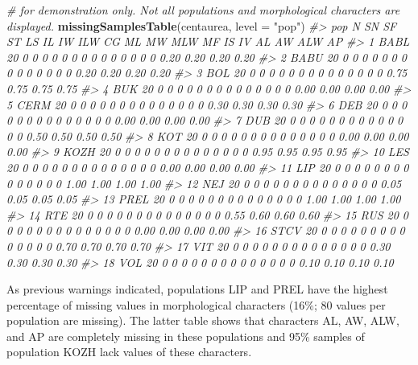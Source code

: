 \documentclass[
]{article}
\newenvironment{Shaded}{\begin{snugshade}}{\end{snugshade}}
\newcommand{\CommentTok}[1]{\textcolor[rgb]{0.56,0.35,0.01}{\textit{#1}}}
\newcommand{\DataTypeTok}[1]{\textcolor[rgb]{0.13,0.29,0.53}{#1}}
\newcommand{\KeywordTok}[1]{\textcolor[rgb]{0.13,0.29,0.53}{\textbf{#1}}}
\newcommand{\NormalTok}[1]{#1}
\newcommand{\StringTok}[1]{\textcolor[rgb]{0.31,0.60,0.02}{#1}}
\begin{document}
\begin{Shaded}
\begin{Highlighting}[]
\CommentTok{# for demonstration only. Not all populations and morphological characters are displayed.}
\KeywordTok{missingSamplesTable}\NormalTok{(centaurea, }\DataTypeTok{level =} \StringTok{"pop"}\NormalTok{)}
\CommentTok{#>     pop  N SN SF ST LS IL IW ILW CG ML MW MLW MF IS IV   AL   AW  ALW   AP}
\CommentTok{#> 1  BABL 20  0  0  0  0  0  0   0  0  0  0   0  0  0  0 0.20 0.20 0.20 0.20}
\CommentTok{#> 2  BABU 20  0  0  0  0  0  0   0  0  0  0   0  0  0  0 0.20 0.20 0.20 0.20}
\CommentTok{#> 3   BOL 20  0  0  0  0  0  0   0  0  0  0   0  0  0  0 0.75 0.75 0.75 0.75}
\CommentTok{#> 4   BUK 20  0  0  0  0  0  0   0  0  0  0   0  0  0  0 0.00 0.00 0.00 0.00}
\CommentTok{#> 5  CERM 20  0  0  0  0  0  0   0  0  0  0   0  0  0  0 0.30 0.30 0.30 0.30}
\CommentTok{#> 6   DEB 20  0  0  0  0  0  0   0  0  0  0   0  0  0  0 0.00 0.00 0.00 0.00}
\CommentTok{#> 7   DUB 20  0  0  0  0  0  0   0  0  0  0   0  0  0  0 0.50 0.50 0.50 0.50}
\CommentTok{#> 8   KOT 20  0  0  0  0  0  0   0  0  0  0   0  0  0  0 0.00 0.00 0.00 0.00}
\CommentTok{#> 9  KOZH 20  0  0  0  0  0  0   0  0  0  0   0  0  0  0 0.95 0.95 0.95 0.95}
\CommentTok{#> 10  LES 20  0  0  0  0  0  0   0  0  0  0   0  0  0  0 0.00 0.00 0.00 0.00}
\CommentTok{#> 11  LIP 20  0  0  0  0  0  0   0  0  0  0   0  0  0  0 1.00 1.00 1.00 1.00}
\CommentTok{#> 12  NEJ 20  0  0  0  0  0  0   0  0  0  0   0  0  0  0 0.05 0.05 0.05 0.05}
\CommentTok{#> 13 PREL 20  0  0  0  0  0  0   0  0  0  0   0  0  0  0 1.00 1.00 1.00 1.00}
\CommentTok{#> 14  RTE 20  0  0  0  0  0  0   0  0  0  0   0  0  0  0 0.55 0.60 0.60 0.60}
\CommentTok{#> 15  RUS 20  0  0  0  0  0  0   0  0  0  0   0  0  0  0 0.00 0.00 0.00 0.00}
\CommentTok{#> 16 STCV 20  0  0  0  0  0  0   0  0  0  0   0  0  0  0 0.70 0.70 0.70 0.70}
\CommentTok{#> 17  VIT 20  0  0  0  0  0  0   0  0  0  0   0  0  0  0 0.30 0.30 0.30 0.30}
\CommentTok{#> 18  VOL 20  0  0  0  0  0  0   0  0  0  0   0  0  0  0 0.10 0.10 0.10 0.10}
\end{Highlighting}
\end{Shaded}

As previous warnings indicated, populations LIP and PREL have the
highest percentage of missing values in morphological characters (16\%;
80 values per population are missing). The latter table shows that
characters AL, AW, ALW, and AP are completely missing in these
populations and 95\% samples of population KOZH lack values of these
characters.
\end{document}
